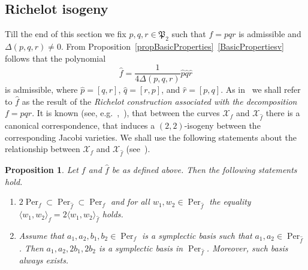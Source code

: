 \documentclass{amsart}
\numberwithin{equation}{section}
\newtheorem{proposition}[theorem]{Proposition}
\theoremstyle{definition}
\theoremstyle{remark}
\DeclareMathOperator{\Per}{Per}
\begin{document}
	\subsection{Richelot isogeny}
	
	Till the end of this section we fix $p,q,r \in \mathfrak P_2$ such that $f = pqr$ is admissible and $\Delta(p,q,r) \ne 0$. From Proposition~\ref{propBasicProperties}~\ref{BasicPropertiesv} follows that the polynomial
	\[
	\hat {f} = \frac{1}{4\Delta(p,q,r)}\hat p\hat q \hat r
	\]
	is admissible, where $\hat p = [q,r]$, $\hat q = [r, p]$, and $\hat r = [p,q]$. As in~\cite{RichelotExpression} we shall refer to $\hat f$ as the result of the {\it{Richelot construction associated with the decomposition}} $f = pqr$. It is known (see, e.g.~\cite{Humbert},~\cite{BostMestre}), that between the curves $\mathcal X_f$ and $\mathcal X_{\hat f}$ there is a canonical correspondence, that induces a $(2,2)$-isogeny between the corresponding Jacobi varieties. We shall use the following statements about the relationship between $\mathcal X_f$ and $\mathcal X_{\hat f}$ (see~\cite[Subsection~2.2]{RichelotExpression}).
	
	\begin{proposition}\label{propRichProperties}
		Let $f$ and $\hat{f}$ be as defined above. Then the following statements hold.
		\begin{enumerate}[label=(\roman*)]
			\item\label{Richi} $2\Per_f \subset \Per_{\hat f} \subset \Per_{f}$ and for all $w_1,w_2 \in \Per_{\hat f}$ the equality $\langle w_1, w_2 \rangle_{f} = 2\langle w_1, w_2\rangle_{\hat f}$ holds.
			\item\label{Richii} Assume that $a_1,a_2,b_1,b_2 \in \Per_f$ is a symplectic basis such that $a_1,a_2\in \Per_{\hat f}$. Then $a_1,a_2,2b_1,2b_2$ is a symplectic basis in $\Per_{\hat f}$. Moreover, such basis always exists.
		\end{enumerate}
	\end{proposition}
	
\end{document}
